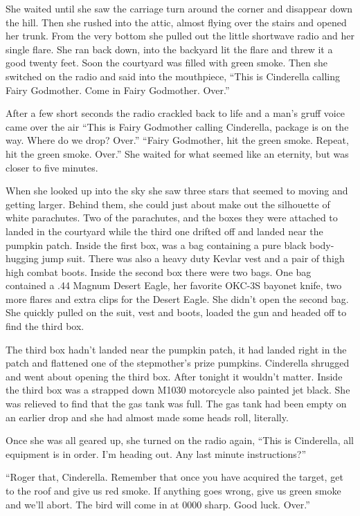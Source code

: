 \documentclass[12pt,letterpaper]{article}
\begin{document}
She waited until she saw the carriage turn around the corner and disappear down the hill. Then she rushed into the attic, almost flying over the stairs and opened her trunk. From the very bottom she pulled out the little shortwave radio and her single flare. She ran back down, into the backyard lit the flare and threw it a good twenty feet. Soon the courtyard was filled with green smoke. Then she switched on the radio and said into the mouthpiece, ``This is Cinderella calling Fairy Godmother. Come in Fairy Godmother. Over.''

After a few short seconds the radio crackled back to life and a man's gruff voice came over the air ``This is Fairy Godmother calling Cinderella, package is on the way. Where do we drop? Over.'' ``Fairy Godmother, hit the green smoke. Repeat, hit the green smoke. Over.'' She waited for what seemed like an eternity, but was closer to five minutes.

When she looked up into the sky she saw three stars that seemed to moving and getting larger. Behind them, she could just about make out the silhouette of white parachutes. Two of the parachutes, and the boxes they were attached to landed in the courtyard while the third one drifted off and landed near the pumpkin patch. Inside the first box, was a bag containing a pure black body-hugging jump suit. There was also a heavy duty Kevlar vest and a pair of thigh high combat boots. Inside the second box there were two bags. One bag contained a .44 Magnum Desert Eagle, her favorite OKC-3S bayonet knife, two more flares and extra clips for the Desert Eagle. She didn't open the second bag. She quickly pulled on the suit, vest and boots, loaded the gun and headed off to find the third box.

The third box hadn't landed near the pumpkin patch, it had landed right in the patch and flattened one of the stepmother's prize pumpkins. Cinderella shrugged and went about opening the third box. After tonight it wouldn't matter. Inside the third box was a strapped down M1030 motorcycle also painted jet black. She was relieved to find that the gas tank was full. The gas tank had been empty on an earlier drop and she had almost made some heads roll, literally.

Once she was all geared up, she turned on the radio again, ``This is Cinderella, all equipment is in order. I'm heading out. Any last minute instructions?''

``Roger that, Cinderella. Remember that once you have acquired the target, get to the roof and give us red smoke. If anything goes wrong, give us green smoke and we'll abort. The bird will come in at 0000 sharp. Good luck. Over.''
\end{document}
